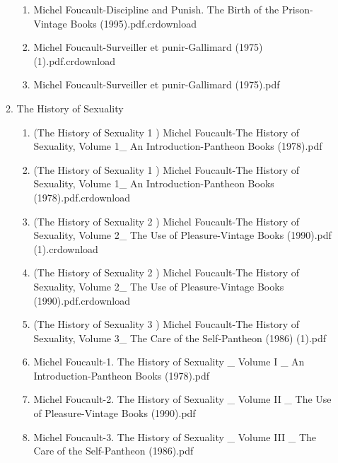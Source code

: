 \documentclass[11pt]{article}
\begin{document}
\begin{enumerate}
\begin{enumerate}
\begin{enumerate}
\item Michel Foucault-Discipline and Punish. The Birth of the Prison-Vintage Books (1995).pdf.crdownload
\label{sec-1-1-1-1-11-29-20-18-3}

\item Michel Foucault-Surveiller et punir-Gallimard (1975) (1).pdf.crdownload
\label{sec-1-1-1-1-11-29-20-18-4}

\item Michel Foucault-Surveiller et punir-Gallimard (1975).pdf
\label{sec-1-1-1-1-11-29-20-18-5}
\end{enumerate}

\item The History of Sexuality
\label{sec-1-1-1-1-11-29-20-19}
\begin{enumerate}
\item (The History of Sexuality 1 ) Michel Foucault-The History of Sexuality, Volume 1\_ An Introduction-Pantheon Books (1978).pdf
\label{sec-1-1-1-1-11-29-20-19-1}

\item (The History of Sexuality 1 ) Michel Foucault-The History of Sexuality, Volume 1\_ An Introduction-Pantheon Books (1978).pdf.crdownload
\label{sec-1-1-1-1-11-29-20-19-2}

\item (The History of Sexuality 2 ) Michel Foucault-The History of Sexuality, Volume 2\_ The Use of Pleasure-Vintage Books (1990).pdf (1).crdownload
\label{sec-1-1-1-1-11-29-20-19-3}

\item (The History of Sexuality 2 ) Michel Foucault-The History of Sexuality, Volume 2\_ The Use of Pleasure-Vintage Books (1990).pdf.crdownload
\label{sec-1-1-1-1-11-29-20-19-4}

\item (The History of Sexuality 3 ) Michel Foucault-The History of Sexuality, Volume 3\_ The Care of the Self-Pantheon (1986) (1).pdf
\label{sec-1-1-1-1-11-29-20-19-5}

\item Michel Foucault-1. The History of Sexuality \_ Volume I \_ An Introduction-Pantheon Books (1978).pdf
\label{sec-1-1-1-1-11-29-20-19-6}

\item Michel Foucault-2. The History of Sexuality \_ Volume II \_ The Use of Pleasure-Vintage Books (1990).pdf
\label{sec-1-1-1-1-11-29-20-19-7}

\item Michel Foucault-3. The History of Sexuality \_ Volume III \_ The Care of the Self-Pantheon (1986).pdf
\label{sec-1-1-1-1-11-29-20-19-8}
\end{enumerate}
\end{enumerate}
\end{enumerate}
\end{document}
